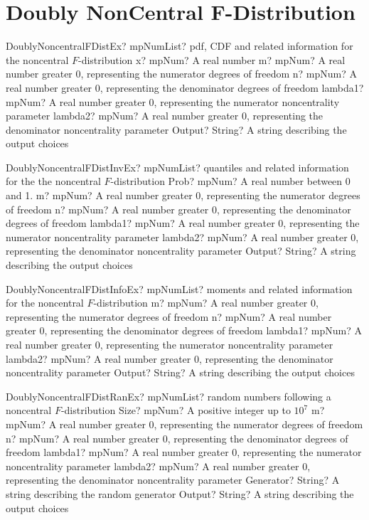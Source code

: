 \documentclass[12pt,a4paper,openany]{book}
\begin{document}
\section{Doubly NonCentral F-Distribution}

\begin{mpFunctionsExtract}
\mpFunctionSixNotImplemented
{DoublyNoncentralFDistEx? mpNumList? pdf, CDF and related information for the noncentral $F$-distribution}
{x? mpNum? A real number}
{m? mpNum? A real number greater 0, representing the numerator  degrees of freedom}
{n? mpNum? A real number greater 0, representing the denominator degrees of freedom}
{lambda1? mpNum? A real number greater 0, representing the numerator noncentrality parameter}
{lambda2? mpNum? A real number greater 0, representing the denominator noncentrality parameter}
{Output? String? A string describing the output choices}
\end{mpFunctionsExtract}

\begin{mpFunctionsExtract}
\mpFunctionSixNotImplemented
{DoublyNoncentralFDistInvEx? mpNumList? quantiles and related information for the the noncentral $F$-distribution}
{Prob? mpNum? A real number between 0 and 1.}
{m? mpNum? A real number greater 0, representing the numerator  degrees of freedom}
{n? mpNum? A real number greater 0, representing the denominator degrees of freedom}
{lambda1? mpNum? A real number greater 0, representing the numerator noncentrality parameter}
{lambda2? mpNum? A real number greater 0, representing the denominator noncentrality parameter}
{Output? String? A string describing the output choices}
\end{mpFunctionsExtract}

\begin{mpFunctionsExtract}
\mpFunctionFiveNotImplemented
{DoublyNoncentralFDistInfoEx? mpNumList? moments and related information for the noncentral $F$-distribution}
{m? mpNum? A real number greater 0, representing the numerator  degrees of freedom}
{n? mpNum? A real number greater 0, representing the denominator degrees of freedom}
{lambda1? mpNum? A real number greater 0, representing the numerator noncentrality parameter}
{lambda2? mpNum? A real number greater 0, representing the denominator noncentrality parameter}
{Output? String? A string describing the output choices}
\end{mpFunctionsExtract}

\begin{mpFunctionsExtract}
\mpFunctionSixNotImplemented
{DoublyNoncentralFDistRanEx? mpNumList? random numbers following a noncentral $F$-distribution}
{Size? mpNum? A positive integer up to $10^7$}
{m? mpNum? A real number greater 0, representing the numerator  degrees of freedom}
{n? mpNum? A real number greater 0, representing the denominator degrees of freedom}
{lambda1? mpNum? A real number greater 0, representing the numerator noncentrality parameter}
{lambda2? mpNum? A real number greater 0, representing the denominator noncentrality parameter}
{Generator? String? A string describing the random generator}
{Output? String? A string describing the output choices}
\end{mpFunctionsExtract}
\end{document}
